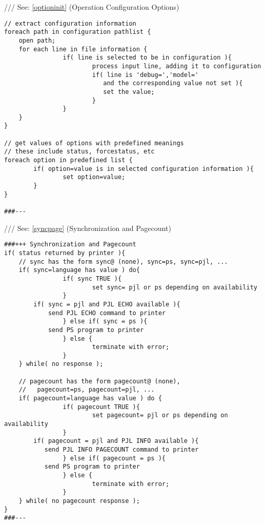 \documentclass[a4paper]{article}
\begin{document}
{\ttfamily ///} See: \ref{optioninit} {(Operation Configuration Options)}
\begin{tscreen}
\begin{verbatim}
// extract configuration information
foreach path in configuration pathlist {
    open path;
    for each line in file information {
                if( line is selected to be in configuration ){
                        process input line, adding it to configuration
                        if( line is 'debug=','model='
                           and the corresponding value not set ){
                           set the value;
                        }
                }
    }
}

// get values of options with predefined meanings
// these include status, forcestatus, etc
foreach option in predefined list {
        if( option=value is in selected configuration information ){
                set option=value;
        }
}

###---
\end{verbatim}
\end{tscreen}

{\ttfamily ///} See: \ref{syncpage} {(Synchronization and Pagecount)}
\begin{tscreen}
\begin{verbatim}
###+++ Synchronization and Pagecount
if( status returned by printer ){
    // sync has the form sync@ (none), sync=ps, sync=pjl, ...
    if( sync=language has value ) do{
                if( sync TRUE ){
                        set sync= pjl or ps depending on availability
                }
        if( sync = pjl and PJL ECHO available ){
            send PJL ECHO command to printer
                } else if( sync = ps ){
            send PS program to printer
                } else {
                        terminate with error;
                }
    } while( no response );

    // pagecount has the form pagecount@ (none),
    //   pagecount=ps, pagecount=pjl, ...
    if( pagecount=language has value ) do {
                if( pagecount TRUE ){
                        set pagecount= pjl or ps depending on availability
                }
        if( pagecount = pjl and PJL INFO available ){
           send PJL INFO PAGECOUNT command to printer
                } else if( pagecount = ps ){
           send PS program to printer
                } else {
                        terminate with error;
                }
    } while( no pagecount response );
}
###---
\end{verbatim}
\end{tscreen}
\end{document}
